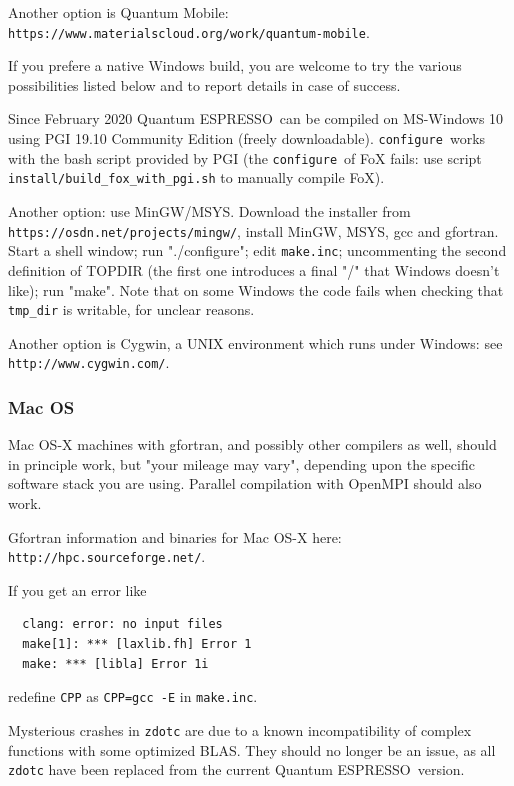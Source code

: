 \documentclass[12pt,a4paper]{article}
\def\qe{{\sc Quantum ESPRESSO}}
\def\configure{\texttt{configure}}
\begin{document}
Another option is  Quantum Mobile:
\texttt{https://www.materialscloud.org/work/quantum-mobile}.

If you prefere a native Windows build, you are welcome to try 
the various possibilities listed below and to report details
in case of success.

Since February 2020 \qe\ can be compiled on MS-Windows 10 using PGI 19.10
Community Edition (freely downloadable). \configure\ works with the bash
script provided by PGI (the \configure\ of FoX fails: use script
\texttt{install/build\_fox\_with\_pgi.sh} to manually compile FoX).

Another option: use MinGW/MSYS. Download the installer from
\texttt{https://osdn.net/projects/mingw/}, install MinGW, MSYS, gcc and
gfortran. Start a shell window; run "./configure"; edit \texttt{make.inc};
uncommenting the second definition of TOPDIR (the first one introduces a
final "/" that Windows doesn't like); run "make". Note that on some Windows
the code fails when checking that \texttt{tmp\_dir} is writable, for unclear
reasons.

Another option is Cygwin, a UNIX environment which runs under Windows: see\\
\texttt{http://www.cygwin.com/}.

\subsubsection{Mac OS}

Mac OS-X machines with gfortran, and possibly other compilers as well,
should in principle work, but "your mileage may vary", depending upon 
the specific software stack you are using. Parallel compilation with 
OpenMPI should also work.

Gfortran information and binaries for Mac OS-X here:
\texttt{http://hpc.sourceforge.net/}.

If you get an error like
\begin{verbatim}
  clang: error: no input files
  make[1]: *** [laxlib.fh] Error 1
  make: *** [libla] Error 1i
\end{verbatim}
redefine \texttt{CPP} as \texttt{CPP=gcc -E} in \texttt{make.inc}.

Mysterious crashes in \texttt{zdotc} are due to a known incompatibility of
complex functions with some optimized BLAS. They should no longer be an
issue, as all \texttt{zdotc} have been replaced from the current \qe\ version.
\end{document}
